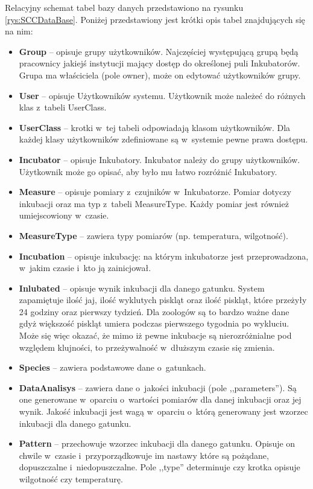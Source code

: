 Relacyjny schemat tabel bazy danych przedstawiono na rysunku
\ref{rys:SCCDataBase}. Poniżej przedstawiony jest krótki opis tabel znajdujących
się na nim:
\begin{itemize}
	\item \textbf{Group} -- opisuje grupy użytkowników. Najczęściej
		występującą grupą będą pracownicy jakiejś instytucji mający dostęp do
		określonej puli Inkubatorów. Grupa ma właściciela (pole owner), może on
		edytować użytkowników grupy. 
	\item \textbf{User} -- opisuje Użytkowników systemu. Użytkownik może
		należeć do różnych klas z~tabeli UserClass.
	\item \textbf{UserClass} -- krotki w~tej tabeli odpowiadają klasom użytkowników.
		Dla każdej klasy użytkowników zdefiniowane są w~systemie pewne prawa
		dostępu. 
	\item \textbf{Incubator} -- opisuje Inkubatory. Inkubator należy do
		grupy użytkowników. Użytkownik może go opisać, aby było mu łatwo rozróżnić
		Inkubatory.
	\item \textbf{Measure} -- opisuje pomiary z~czujników w~Inkubatorze.
		Pomiar dotyczy inkubacji oraz ma typ z~tabeli MeasureType. Każdy pomiar jest
		również umiejscowiony w~czasie.
	\item \textbf{MeasureType} -- zawiera typy pomiarów (np. temperatura,
		wilgotność).
	\item \textbf{Incubation} -- opisuje inkubację: na którym inkubatorze
		jest przeprowadzona, w~jakim czasie i~kto ją zainicjował. 
	\item \textbf{Inlubated} -- opisuje wynik inkubacji dla danego gatunku.
		System zapamiętuje ilość jaj, ilość wyklutych piskląt oraz ilość
		piskląt, które przeżyły 24 godziny oraz pierwszy tydzień. Dla zoologów są to
		bardzo ważne dane gdyż większość piskląt umiera podczas pierwszego tygodnia po wykluciu.
		Może się więc okazać, że mimo iż pewne inkubacje są nierozróżnialne pod
		względem klujności, to przeżywalność w~dłuższym czasie się zmienia. 
	\item \textbf{Species} -- zawiera podstawowe dane o~gatunkach.
	\item \textbf{DataAnalisys} -- zawiera dane o~jakości inkubacji (pole
		,,parameters''). Są one generowane w~oparciu o~wartości pomiarów dla danej
		inkubacji oraz jej wynik. Jakość inkubacji jest wagą w~oparciu o~którą
		generowany jest wzorzec inkubacji dla danego gatunku. 
	\item \textbf{Pattern} -- przechowuje wzorzec inkubacji dla
		danego gatunku. Opisuje on chwile w~czasie i~przyporządkowuje im nastawy
		które są pożądane, dopuszczalne i~niedopuszczalne. Pole ,,type'' determinuje czy
		krotka opisuje wilgotność czy temperaturę. 
\end{itemize}

